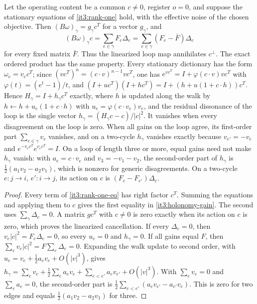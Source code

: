 Let the operating content be a common $c\ne0$, register $o=0$, and suppose the stationary equations of \cref{it3:rank-one} hold, with the effective noise of the chosen objective. Then
$(B\omega)_\gamma=g_\gamma c^T$ for a vector $g_\gamma$, and
\begin{equation}
(B\omega)_\gamma c
=\sum_{e\in\gamma}F_e\Delta_e
=\sum_{e\in\gamma}(F_e-\bar F)\Delta_e
\label{it3:holonomy-gain}
\end{equation}
for every fixed matrix $\bar F$. Thus the linearized loop map annihilates $c^\perp$. The exact ordered product has the same property. Every stationary dictionary has the form $\omega_e=v_ec^T$; since $(vc^T)^n=(c\cdot v)^{n-1}vc^T$, one has $e^{vc^T}=I+\varphi(c\cdot v)vc^T$ with $\varphi(t)=(e^t-1)/t$, and $(I+uc^T)(I+hc^T)=I+(h+u(1+c\cdot h))c^T$. Hence $H_\gamma=I+h_\gamma c^T$ exactly, where $h$ is updated along the walk by $h\leftarrow h+u_e(1+c\cdot h)$ with $u_e=\varphi(c\cdot v_e)v_e$, and the residual dissonance of the loop is the single vector $h_\gamma=(H_\gamma c-c)/|c|^2$. It vanishes when every disagreement on the loop is zero. When all gains on the loop agree, its first-order part $\sum_{e\in\gamma}v_e$ vanishes, and on a two-cycle $h_\gamma$ vanishes exactly because $v_{e'}=-v_e$ and $e^{-v_ec^T}e^{v_ec^T}=I$. On a loop of length three or more, equal gains need not make $h_\gamma$ vanish: with $a_e=c\cdot v_e$ and $v_3=-v_1-v_2$, the second-order part of $h_\gamma$ is $\frac12(a_1v_2-a_2v_1)$, which is nonzero for generic disagreements. On a two-cycle $e:j\to i$, $e':i\to j$, its action on $c$ is $(F_e-F_{e'})\Delta_e$.
\begin{proof}
Every term of \cref{it3:rank-one-eq} has right factor $c^T$. Summing the equations and applying them to $c$ gives the first equality in \cref{it3:holonomy-gain}. The second uses $\sum_\gamma\Delta_e=0$. A matrix $gc^T$ with $c\ne0$ is zero exactly when its action on $c$ is zero, which proves the linearized cancellation. If every $\Delta_e=0$, then $v_e|c|^2=F_e\Delta_e=0$, so every $u_e=0$ and $h_\gamma=0$. If all gains equal $F$, then $\sum_ev_e|c|^2=F\sum_e\Delta_e=0$. Expanding the walk update to second order, with $u_e=v_e+\frac12a_ev_e+O(|v|^3)$, gives $h_\gamma=\sum_ev_e+\frac12\sum_ea_ev_e+\sum_{e<e'}a_ev_{e'}+O(|v|^3)$. With $\sum_ev_e=0$ and $\sum_ea_e=0$, the second-order part is $\frac12\sum_{e<e'}(a_ev_{e'}-a_{e'}v_e)$. This is zero for two edges and equals $\frac12(a_1v_2-a_2v_1)$ for three.
\end{proof}


